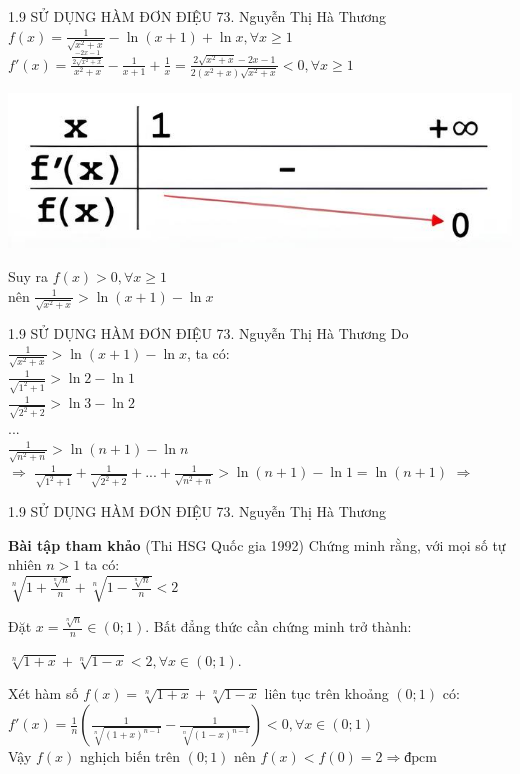 \begin{frame}{1.9 SỬ DỤNG HÀM ĐƠN ĐIỆU\hspace{2cm}  73. Nguyễn Thị Hà Thương} 
\large $f(x)=\frac{1}{\sqrt{x^2+x}}-\ln{(x+1)}+\ln{x}, \forall x \geq 1$\\
\large $f'(x)= \frac{\frac{-2x-1}{2\sqrt{x^2+x}}}{x^2+x} - \frac{1}{x+1} + \frac{1}{x} = \frac{2\sqrt{x^2+x}-2x-1}{2(x^2+x)\sqrt{x^2+x}} < 0, \forall x \geq 1 $
\pause
\begin{center}
    \includegraphics[scale=0.2]{bbt (1.9).JPG}
\end{center}
\pause
\large Suy ra $f(x)>0,\forall x \geq 1 $\\
\large nên $\frac{1}{\sqrt{x^2+x}} > \ln{(x+1)} - \ln{x}$
\end{frame}

\begin{frame}{1.9 SỬ DỤNG HÀM ĐƠN ĐIỆU\hspace{2cm}  73. Nguyễn Thị Hà Thương} 
		Do $\frac{1}{\sqrt{x^2+x}} > \ln{(x+1)} - \ln{x}$, ta có:\\
		$\frac{1}{\sqrt{1^2+1}} > \ln{2} - \ln{1}$\\
		$\frac{1}{\sqrt{2^2+2}} > \ln{3} - \ln{2}$\\
		...\\
		$\frac{1}{\sqrt{n^2+n}} > \ln{(n+1)} - \ln{n}$\\
$\Rightarrow$ $\frac{1}{\sqrt{1^2+1}}+\frac{1}{\sqrt{2^2+2}}+...+\frac{1}{\sqrt{n^2+n}} > \ln{(n+1)} - \ln{1} = \ln{(n+1)}$ $\Rightarrow$ {}
\end{frame}

\begin{frame}{1.9 SỬ DỤNG HÀM ĐƠN ĐIỆU\hspace{2cm}  73. Nguyễn Thị Hà Thương}
\begin{block}{\textbf{Bài tập tham khảo} (Thi HSG Quốc gia 1992)}
Chứng minh rằng, với mọi số tự nhiên $n>1$ ta có:\\
\centering $\sqrt[n]{1+\frac{\sqrt[n]{n}}{n}}+\sqrt[n]{1-\frac{\sqrt[n]{n}}{n}} < 2$
\end{block}
\pause
Đặt $x=\frac{\sqrt[n]{n}}{n} \in (0;1)$. Bất đẳng thức cần chứng minh trở thành:\\
\begin{center}
$\sqrt[n]{1+x}+\sqrt[n]{1-x} < 2, \forall x\in (0;1)$.
\end{center}
\pause
Xét hàm số $f(x)=\sqrt[n]{1+x}+\sqrt[n]{1-x}$ liên tục trên khoảng $(0;1)$ có:\\
$f'(x)= \frac{1}{n}(\frac{1}{\sqrt[n]{(1+x)^{n-1}}}-\frac{1}{\sqrt[n]{(1-x)^{n-1}}})<0, \forall x \in (0;1)$\\
Vậy $f(x)$ nghịch biến trên $(0;1)$ nên $f(x)<f(0)=2 \Rightarrow \text{đpcm}$
\end{frame}

